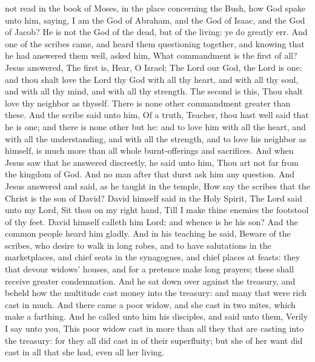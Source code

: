 not read in the book of Moses, in the place concerning the Bush, how God spake unto him, saying, I am the God of Abraham, and the God of Isaac, and the God of Jacob? He is not the God of the dead, but of the living: ye do greatly err.  And one of the scribes came, and heard them questioning together, and knowing that he had answered them well, asked him, What commandment is the first of all? Jesus answered, The first is, Hear, O Israel; The Lord our God, the Lord is one: and thou shalt love the Lord thy God with all thy heart, and with all thy soul, and with all thy mind, and with all thy strength. The second is this, Thou shalt love thy neighbor as thyself. There is none other commandment greater than these. And the scribe said unto him, Of a truth, Teacher, thou hast well said that he is one; and there is none other but he: and to love him with all the heart, and with all the understanding, and with all the strength, and to love his neighbor as himself, is much more than all whole burnt-offerings and sacrifices. And when Jesus saw that he answered discreetly, he said unto him, Thou art not far from the kingdom of God. And no man after that durst ask him any question.  And Jesus answered and said, as he taught in the temple, How say the scribes that the Christ is the son of David? David himself said in the Holy Spirit, The Lord said unto my Lord, Sit thou on my right hand, Till I make thine enemies the footstool of thy feet.  David himself calleth him Lord; and whence is he his son? And the common people heard him gladly.  And in his teaching he said, Beware of the scribes, who desire to walk in long robes, and to have salutations in the marketplaces, and chief seats in the synagogues, and chief places at feasts: they that devour widows’ houses, and for a pretence make long prayers; these shall receive greater condemnation.  And he sat down over against the treasury, and beheld how the multitude cast money into the treasury: and many that were rich cast in much. And there came a poor widow, and she cast in two mites, which make a farthing. And he called unto him his disciples, and said unto them, Verily I say unto you, This poor widow cast in more than all they that are casting into the treasury: for they all did cast in of their superfluity; but she of her want did cast in all that she had, even all her living. 

